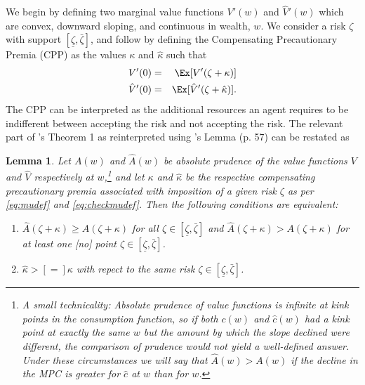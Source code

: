 \documentclass[titlepage]{\econtex}
\newtheorem{lemma}{Lemma}
\begin{document}
We begin by defining two marginal value functions $V'(w)$ and $\hat{V}'(w)$ which are convex, downward sloping, and continuous in wealth, $w$. We consider a risk $\zeta$ with support $[\underline{\zeta},\bar{\zeta}]$, and follow \citet{kimball:smallandlarge} by defining the Compensating Precautionary Premia (CPP) as the values $\kappa$ and $\hat{\kappa}$ such that
\begin{eqnarray}
V'(0) & = & \Ex[V'(\zeta + \kappa)] \label{eq:mudef}
\\ \hat{V}'(0) & = & \Ex[\hat{V}'(\zeta + \hat{\kappa})] \label{eq:checkmudef}.
\end{eqnarray}
The CPP can be interpreted as the additional resources an agent requires to be indifferent between accepting the risk and not accepting the risk. The relevant part of \citet{pratt:smallandlarge}'s Theorem 1 as reinterpreted using \citet{kimball:smallandlarge}'s Lemma (p. 57) can be restated as
\begin{lemma}\label{lemma:kimpratt}
	Let $A(w)$ and $\hat{A}(w)$ be absolute prudence of the
	value functions $V$ and $\hat{V}$ respectively at
	$w$,\footnote{A small technicality:
		Absolute prudence of value functions is infinite at kink points in
		the consumption function, so if both $c(w)$ and $\hat{c}(w)$ had a
		kink point at exactly the same $w$ but the amount by which the
		slope declined were different, the comparison of prudence would not
		yield a well-defined answer.  Under these circumstances we will
		say that $\hat{A}(w) > A(w)$ if the decline in the MPC is
		greater for $\hat{c}$ at $w$ than for $w$. } and let $\kappa$
	and $\hat{\kappa}$ be the respective compensating precautionary
	premia associated with imposition of a given risk
	$\zeta$ as per \eqref{eq:mudef} and \eqref{eq:checkmudef}.  %
	Then the following conditions are equivalent:%
	\begin{enumerate}
		\item $\hat{A}(\zeta+\kappa) \geq A(\zeta+\kappa)$ for all $\zeta \in [\underline{\zeta},\bar{\zeta}]$ and $\hat{A}(\zeta+\kappa) > A(\zeta+\kappa)$ for at least one [no] point $\zeta \in [\underline{\zeta},\bar{\zeta}]$.
		\item $\hat{\kappa} > [=] \kappa$ with repect to the same risk $\zeta \in [\underline{\zeta},\bar{\zeta}]$.

	\end{enumerate}
\end{lemma}
\end{document}
